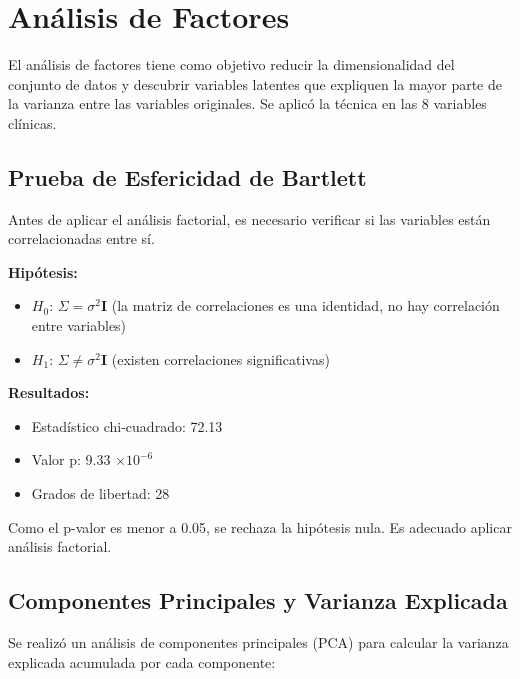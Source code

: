 \documentclass[12pt]{report}
\begin{document}

\section{Análisis de Factores}
El análisis de factores tiene como objetivo reducir la dimensionalidad del conjunto de datos y descubrir variables latentes que expliquen la mayor parte de la varianza entre las variables originales. Se aplicó la técnica en las 8 variables clínicas.

\subsection{Prueba de Esfericidad de Bartlett}
Antes de aplicar el análisis factorial, es necesario verificar si las variables están correlacionadas entre sí.

\textbf{Hipótesis:}
\begin{itemize}
    \item $H_0$: $\Sigma = \sigma^2 \mathbf{I}$ (la matriz de correlaciones es una identidad, no hay correlación entre variables)
    \item $H_1$: $\Sigma \neq \sigma^2 \mathbf{I}$ (existen correlaciones significativas)
\end{itemize}

\textbf{Resultados:}
\begin{itemize}
    \item Estadístico chi-cuadrado: 72.13
    \item Valor p: 9.33 $\times 10^{-6}$
    \item Grados de libertad: 28
\end{itemize}

\noindent Como el p-valor es menor a 0.05, se rechaza la hipótesis nula. Es adecuado aplicar análisis factorial.

\newpage

\subsection{Componentes Principales y Varianza Explicada}
Se realizó un análisis de componentes principales (PCA) para calcular la varianza explicada acumulada por cada componente:
\end{document}
